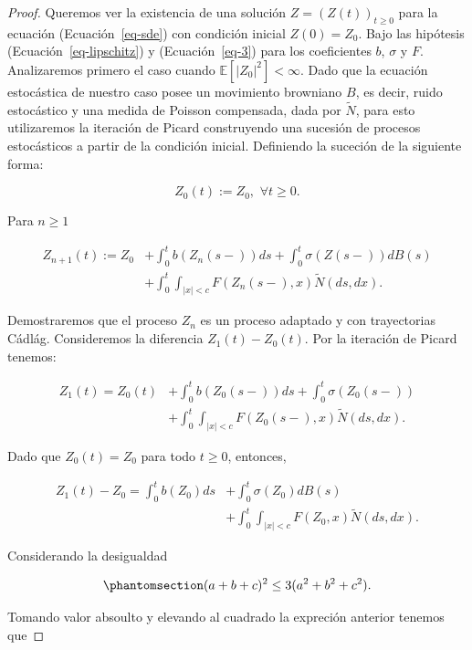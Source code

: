 \documentclass[
  spanish,
  us-letterpaper,
]{scrreprt}
\theoremstyle{plain}
\theoremstyle{plain}
\theoremstyle{definition}
\theoremstyle{plain}
\theoremstyle{remark}
\begin{document}
\begin{proof}
Queremos ver la existencia de una solución \(Z=(Z(t))_{t\geq 0}\) para
la ecuación (Ecuación~\ref{eq-sde}) con condición inicial \(Z(0)=Z_0\).
Bajo las hipótesis (Ecuación~\ref{eq-lipschitz}) y (Ecuación~\ref{eq-3})
para los coeficientes \(b\), \(\sigma\) y \(F\). Analizaremos primero el
caso cuando \(\mathbb{E}[|Z_0|^2]<\infty\). Dado que la ecuación
estocástica de nuestro caso posee un movimiento browniano \(B\), es
decir, ruido estocástico y una medida de Poisson compensada, dada por
\(\widetilde{N}\), para esto utilizaremos la iteración de Picard
construyendo una sucesión de procesos estocásticos a partir de la
condición inicial. Definiendo la suceción de la siguiente forma:

\[
    Z_0(t) :=Z_0, \, \, \forall t\geq 0.
\]

Para \(n\geq 1\)

\[
    \begin{aligned}
        Z_{n+1}(t) := Z_0 & +\int _0^t b(Z_n(s-))ds+\int_0^t \sigma(Z(s-))dB(s)\\ 
        & + \int_0^t \int _{|x|<c} F(Z_n(s-),x)\widetilde{N}(ds,dx).
    \end{aligned}
\]

Demostraremos que el proceso \(Z_n\) es un proceso adaptado y con
trayectorias Cádlág. Consideremos la diferencia \(Z_1(t)-Z_0(t)\). Por
la iteración de Picard tenemos:

\[
    \begin{aligned}
        Z_1(t) = Z_0(t) & + \int_0^t b(Z_0(s-))ds +\int_0^t\sigma(Z_0(s-))\\ 
        & +\int_0^t \int_{|x|<c} F(Z_0(s-),x)\widetilde{N}(ds,dx).
    \end{aligned}
\]

Dado que \(Z_0(t)=Z_0\) para todo \(t\geq 0\), entonces,

\[
    \begin{aligned}
        Z_1(t)-Z_0 = \int_0^t b(Z_0) ds & + \int_0^t \sigma(Z_0)dB(s)\\ 
        & + \int_0^t\int_{|x|<c} F(Z_0,x)\widetilde{N}(ds,dx). 
    \end{aligned}
\]

Considerando la desigualdad

\begin{equation}\phantomsection\label{eq-des}{
(a+b+c)^2\leq 3(a^2+b^2+c^2).
}\end{equation}

Tomando valor absoulto y elevando al cuadrado la expreción anterior
tenemos que


\end{proof}
\end{document}
